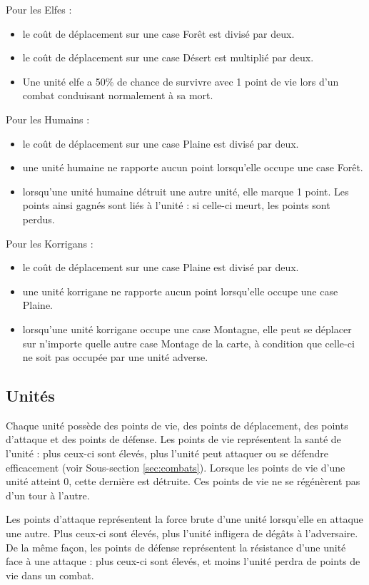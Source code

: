 		Pour les Elfes :
		\begin{itemize}
			\item le coût de déplacement sur une case Forêt est divisé par deux. 
			\item le coût de déplacement sur une case Désert est multiplié par deux.
			\item Une unité elfe a 50\% de chance de survivre avec 1 point de vie lors d’un combat conduisant normalement à sa mort.
		\end{itemize}
		
		Pour les Humains :
		\begin{itemize}
			\item le coût de déplacement sur une case Plaine est divisé par deux.
			\item une unité humaine ne rapporte aucun point lorsqu'elle occupe une case Forêt.
			\item lorsqu’une unité humaine détruit une autre unité, elle marque 1 point. Les points ainsi gagnés sont liés à l'unité : si celle-ci meurt, les points sont perdus.
		\end{itemize}
		
		Pour les Korrigans :
		\begin{itemize}
			\item le coût de déplacement sur une case Plaine est divisé par deux.
			\item une unité korrigane ne rapporte aucun point lorsqu'elle occupe une case Plaine.
			\item lorsqu'une unité korrigane occupe une case Montagne, elle peut se déplacer sur n’importe quelle autre case Montage de la carte, à condition que celle-ci ne soit pas occupée par une unité adverse.
		\end{itemize}

	\subsection{Unités}
	Chaque unité possède des points de vie, des points de déplacement, des points d'attaque et des points de défense. Les points de vie représentent la santé de l'unité : plus ceux-ci sont élevés, plus l'unité peut attaquer ou se défendre efficacement (voir Sous-section \ref{sec:combats}). Lorsque les points de vie d'une unité atteint 0, cette dernière est détruite. Ces points de vie ne se régénèrent pas d'un tour à l'autre.
	
	Les points d'attaque représentent la force brute d'une unité lorsqu'elle en attaque une autre.  Plus ceux-ci sont élevés, plus l'unité infligera de dégâts à l'adversaire. De la même façon, les points de défense représentent la résistance d'une unité face à une attaque : plus ceux-ci sont élevés, et moins l'unité perdra de points de vie dans un combat. 
	
